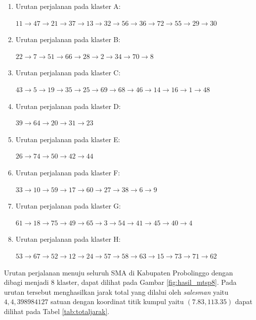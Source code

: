 \begin{enumerate}
\item Urutan perjalanan pada klaster A:

$11\rightarrow47\rightarrow21\rightarrow37\rightarrow13\rightarrow32\rightarrow56\rightarrow36\rightarrow72\rightarrow55\rightarrow29\rightarrow30$

\item Urutan perjalanan pada klaster B:

$22\rightarrow7\rightarrow51\rightarrow66\rightarrow28\rightarrow2\rightarrow34\rightarrow70\rightarrow8$

\item Urutan perjalanan pada klaster C:

$43\rightarrow5\rightarrow19\rightarrow35\rightarrow25\rightarrow69\rightarrow68\rightarrow46\rightarrow14\rightarrow16\rightarrow1\rightarrow48$

\item Urutan perjalanan pada klaster D:

$39\rightarrow64\rightarrow20\rightarrow31\rightarrow23$

\item Urutan perjalanan pada klaster E:

$26\rightarrow74\rightarrow50\rightarrow42\rightarrow44$

\item Urutan perjalanan pada klaster F:

$33\rightarrow10\rightarrow59\rightarrow17\rightarrow60\rightarrow27\rightarrow38\rightarrow6\rightarrow9$

\item Urutan perjalanan pada klaster G:

$61\rightarrow18\rightarrow75\rightarrow49\rightarrow65\rightarrow3\rightarrow54\rightarrow41\rightarrow45\rightarrow40\rightarrow4$

\item Urutan perjalanan pada klaster H:

$53\rightarrow67\rightarrow52\rightarrow12\rightarrow24\rightarrow57\rightarrow58\rightarrow63\rightarrow15\rightarrow73\rightarrow71\rightarrow62$
\end{enumerate}

Urutan perjalanan menuju seluruh SMA di Kabupaten Probolinggo dengan dibagi menjadi 8 klaster, dapat dilihat pada Gambar \ref{fig:hasil_mtsp8}. Pada urutan tersebut menghasilkan jarak total yang dilalui oleh \textit{salesman} yaitu $4,4,398984127$ satuan dengan koordinat titik kumpul yaitu $(7.83, 113.35)$ dapat dilihat pada Tabel \ref{tab:totaljarak}.

